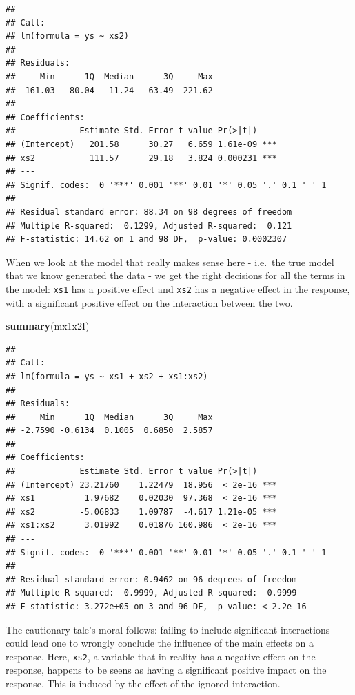 \documentclass[
]{book}
\newenvironment{Shaded}{\begin{snugshade}}{\end{snugshade}}
\newcommand{\FunctionTok}[1]{\textcolor[rgb]{0.13,0.29,0.53}{\textbf{#1}}}
\newcommand{\NormalTok}[1]{#1}
\begin{document}
\begin{verbatim}
## 
## Call:
## lm(formula = ys ~ xs2)
## 
## Residuals:
##     Min      1Q  Median      3Q     Max 
## -161.03  -80.04   11.24   63.49  221.62 
## 
## Coefficients:
##             Estimate Std. Error t value Pr(>|t|)    
## (Intercept)   201.58      30.27   6.659 1.61e-09 ***
## xs2           111.57      29.18   3.824 0.000231 ***
## ---
## Signif. codes:  0 '***' 0.001 '**' 0.01 '*' 0.05 '.' 0.1 ' ' 1
## 
## Residual standard error: 88.34 on 98 degrees of freedom
## Multiple R-squared:  0.1299, Adjusted R-squared:  0.121 
## F-statistic: 14.62 on 1 and 98 DF,  p-value: 0.0002307
\end{verbatim}

When we look at the model that really makes sense here - i.e.~the true model that we know generated the data - we get the right decisions for all the terms in the model: \texttt{xs1} has a positive effect and \texttt{xs2} has a negative effect in the response, with a significant positive effect on the interaction between the two.

\begin{Shaded}
\begin{Highlighting}[]
\FunctionTok{summary}\NormalTok{(mx1x2I)}
\end{Highlighting}
\end{Shaded}

\begin{verbatim}
## 
## Call:
## lm(formula = ys ~ xs1 + xs2 + xs1:xs2)
## 
## Residuals:
##     Min      1Q  Median      3Q     Max 
## -2.7590 -0.6134  0.1005  0.6850  2.5857 
## 
## Coefficients:
##             Estimate Std. Error t value Pr(>|t|)    
## (Intercept) 23.21760    1.22479  18.956  < 2e-16 ***
## xs1          1.97682    0.02030  97.368  < 2e-16 ***
## xs2         -5.06833    1.09787  -4.617 1.21e-05 ***
## xs1:xs2      3.01992    0.01876 160.986  < 2e-16 ***
## ---
## Signif. codes:  0 '***' 0.001 '**' 0.01 '*' 0.05 '.' 0.1 ' ' 1
## 
## Residual standard error: 0.9462 on 96 degrees of freedom
## Multiple R-squared:  0.9999, Adjusted R-squared:  0.9999 
## F-statistic: 3.272e+05 on 3 and 96 DF,  p-value: < 2.2e-16
\end{verbatim}

The cautionary tale's moral follows: failing to include significant interactions could lead one to wrongly conclude the influence of the main effects on a response. Here, \texttt{xs2}, a variable that in reality has a negative effect on the response, happens to be seens as having a significant positive impact on the response. This is induced by the effect of the ignored interaction.
\end{document}
